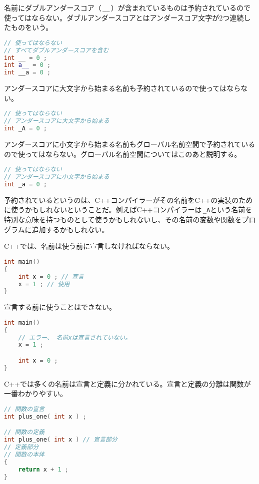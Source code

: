 名前にダブルアンダースコア（\,\texttt{\_\_}\,）が含まれているものは予約されているので使ってはならない。ダブルアンダースコアとはアンダースコア文字が2つ連続したものをいう。

\begin{lstlisting}[language={C++}]
// 使ってはならない
// すべてダブルアンダースコアを含む
int __ = 0 ;
int a__ = 0 ;
int __a = 0 ;
\end{lstlisting}

アンダースコアに大文字から始まる名前も予約されているので使ってはならない。

\begin{lstlisting}[language={C++}]
// 使ってはならない
// アンダースコアに大文字から始まる
int _A = 0 ;
\end{lstlisting}

アンダースコアに小文字から始まる名前もグローバル名前空間で予約されているので使ってはならない。グローバル名前空間についてはこのあと説明する。

\begin{lstlisting}[language={C++}]
// 使ってはならない
// アンダースコアに小文字から始まる
int _a = 0 ;
\end{lstlisting}

予約されているというのは、C++コンパイラーがその名前をC++の実装のために使うかもしれないということだ。例えばC++コンパイラーは\,\texttt{\_A}という名前を特別な意味を持つものとして使うかもしれないし、その名前の変数や関数をプログラムに追加するかもしれない。


C++では、名前は使う前に宣言しなければならない。

\begin{lstlisting}[language={C++}]
int main()
{
    int x = 0 ; // 宣言
    x = 1 ; // 使用
}
\end{lstlisting}

宣言する前に使うことはできない。

\begin{lstlisting}[language={C++}]
int main()
{
    // エラー、 名前xは宣言されていない。
    x = 1 ; 

    int x = 0 ;
}
\end{lstlisting}

C++では多くの名前は宣言と定義に分かれている。宣言と定義の分離は関数が一番わかりやすい。

\begin{lstlisting}[language={C++}]
// 関数の宣言
int plus_one( int x ) ;

// 関数の定義
int plus_one( int x ) // 宣言部分
// 定義部分
// 関数の本体
{
    return x + 1 ;
}
\end{lstlisting}

